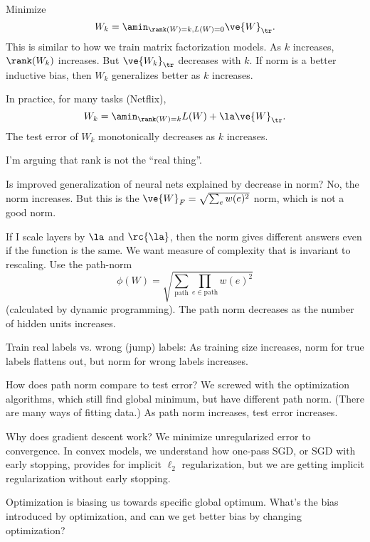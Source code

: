Minimize
$$W_k = \amin_{\rank(W)=k, L(W)=0} \ve{W}_{\tr}.$$
This is similar to how we train matrix factorization models. 
As $k$ increases, $\rank(W_k)$ increases. But $\ve{W_k}_{\tr}$ decreases with $k$. If norm is a better inductive bias, then $W_k$ generalizes better as $k$ increases.

In practice, for many tasks (Netflix),
$$W_k = \amin_{\rank(W)=k} L(W) + \la \ve{W}_{\tr}.$$
The test error of $W_k$ monotonically decreases as $k$ increases.



I'm arguing that rank is not the ``real thing''.

Is improved generalization of neural nets explained by decrease in norm?
No, the norm increases. But this is the $\ve{W}_F = \sqrt{\sum_e w(e)^2}$ norm, which is not a good norm.

If I scale layers by $\la$ and $\rc{\la}$, then the norm gives different answers even if the function is the same. We want measure of complexity that is invariant to rescaling. 
Use the path-norm
$$
\phi(W) = \sqrt{\sum_{\text{path}}\prod_{e\in \text{path}} w(e)^2}
$$
(calculated by dynamic programming).
The path norm decreases as the number of hidden units increases.

Train real labels vs. wrong (jump) labels: As training size increases, norm for true labels flattens out, but norm for wrong labels increases.


How does path norm compare to test error? We screwed with the optimization algorithms, which still find global minimum, but have different path norm. (There are many ways of fitting data.) As path norm increases, test error increases.

Why does gradient descent work? We minimize unregularized error to convergence. In convex models, we understand how one-pass SGD, or SGD with early stopping, provides for implicit $\ell_2$ regularization, but we are getting implicit regularization without early stopping.

Optimization is biasing us towards specific global optimum. What's the bias introduced by optimization, and can we get better bias by changing optimization?

